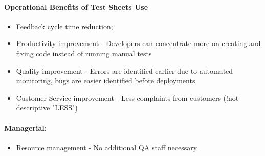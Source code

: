 \paragraph{Operational Benefits of Test Sheets Use}
\begin{itemize}
	\item Feedback cycle time reduction;
	\item Productivity improvement - Developers can concentrate more on creating and fixing code instead of running manual tests
	\item Quality improvement - Errors are identified earlier due to automated monitoring, bugs are easier identified before deployments
	\item Customer Service improvement - Less complaints from customers (!not descriptive "LESS")
\end{itemize}

\paragraph{Managerial:}
\begin{itemize}
	\item Resource management - No additional QA staff necessary
\end{itemize}

